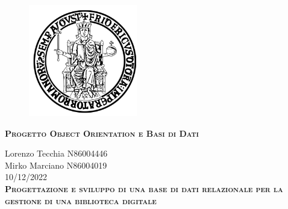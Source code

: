 \documentclass{report}
\begin{document}
\begin{center}
	
\end{center}
    \begin{figure}[htbp!]
        \begin{center}
            \includegraphics[width=.25\textwidth]{Immagini/FedericoII.png}
        \end{center}
    \end{figure}
    
    {\scshape\Large\bfseries Progetto Object Orientation e Basi di Dati}
    \begin{center}
        Lorenzo Tecchia N86004446 \\ Mirko Marciano N86004019 \\ 10/12/2022 \\
        
        
        
        
        \scshape\Large\bfseries Progettazione e sviluppo di una base di dati relazionale per la gestione di una biblioteca digitale
        
    \end{center}


    \newpage
    
    \tableofcontents
    
    
    
    
    
    
    
\end{document}
